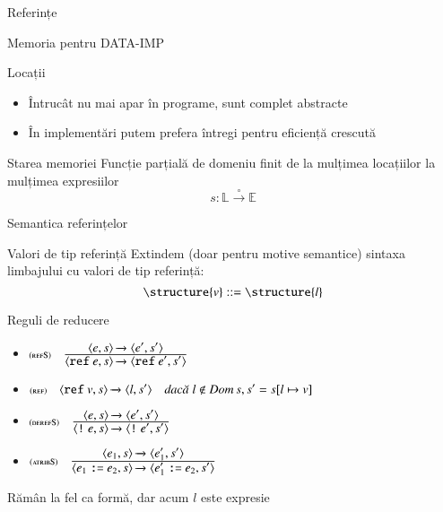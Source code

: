 \documentclass[xcolor=pdftex,romanian,colorlinks]{beamer}
\begin{document}
\begin{section}{Referințe}
\begin{frame}{Memoria pentru DATA-IMP}
\begin{block}{Locații}
\begin{itemize}
\item Întrucât nu mai apar în programe, sunt complet abstracte
\item În implementări putem prefera întregi pentru eficiență crescută
\end{itemize}
\end{block}

\begin{block}{Starea memoriei}
Funcție parțială de domeniu finit de la mulțimea locațiilor la mulțimea expresiilor
\[s : \mathbb{L} \stackrel\circ\rightarrow \mathbb{E}\] 
\end{block}
\end{frame}

\begin{frame}{Semantica referințelor}
\begin{block}{Valori de tip referință}
Extindem (doar pentru motive semantice) sintaxa limbajului cu valori de tip referință:
\[\structure{v} \mathrel{::=} \structure{l}\]
\end{block}
\begin{block}{Reguli de reducere}
\begin{itemize}
\item[] $\reg[refS]{\Ss{\c{\Sref e,s}}{\c{\Sref e',s'}}}{\Ss{\c{e,s}}{\c{e',s'}}}{}$

\item[] $\reg[ref]{\Ss{\c{\Sref v,s}}{\c{l,s'}}}{}{l\not\in\Dom s, s' = s[l\mapsto v]}$

\item[] $\reg[derefS]{\Ss{\c{\terminal{!} e,s}}{\c{\terminal{!} e',s'}}}{\Ss{\c{e,s}}{\c{e',s'}}}{}$

\item[] $\reg[atribS]{\Ss{\c{e_1 \terminal{:=} e_2,s}}{\c{e_1' \terminal{:=} e_2,s'}}}{\Ss{\c{e_1,s}}{\c{e_1',s'}}}{}$
\end{itemize}

 Rămân la fel ca formă, dar acum $l$ este expresie
\end{block}
\end{frame}
\end{section}
\end{document}
